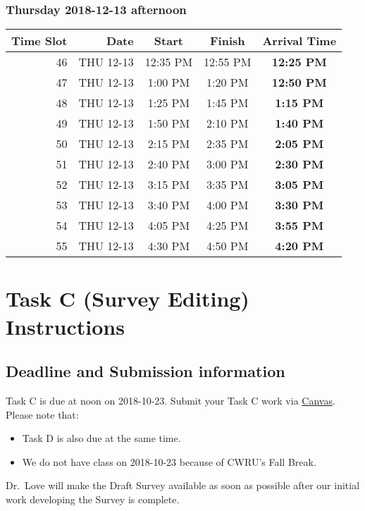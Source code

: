\documentclass[]{book}
\providecommand{\tightlist}{%
  \setlength{\itemsep}{0pt}\setlength{\parskip}{0pt}}
\theoremstyle{definition}
\theoremstyle{definition}
\theoremstyle{definition}
\theoremstyle{remark}
\begin{document}
\hypertarget{thursday-2018-12-13-afternoon}{%
\subsection{Thursday 2018-12-13
afternoon}\label{thursday-2018-12-13-afternoon}}

\begin{longtable}[]{@{}rrccc@{}}
\toprule
Time Slot & Date & Start & Finish & \textbf{Arrival Time}\tabularnewline
\midrule
\endhead
46 & THU 12-13 & 12:35 PM & 12:55 PM & \textbf{12:25 PM}\tabularnewline
47 & THU 12-13 & 1:00 PM & 1:20 PM & \textbf{12:50 PM}\tabularnewline
48 & THU 12-13 & 1:25 PM & 1:45 PM & \textbf{1:15 PM}\tabularnewline
49 & THU 12-13 & 1:50 PM & 2:10 PM & \textbf{1:40 PM}\tabularnewline
50 & THU 12-13 & 2:15 PM & 2:35 PM & \textbf{2:05 PM}\tabularnewline
51 & THU 12-13 & 2:40 PM & 3:00 PM & \textbf{2:30 PM}\tabularnewline
52 & THU 12-13 & 3:15 PM & 3:35 PM & \textbf{3:05 PM}\tabularnewline
53 & THU 12-13 & 3:40 PM & 4:00 PM & \textbf{3:30 PM}\tabularnewline
54 & THU 12-13 & 4:05 PM & 4:25 PM & \textbf{3:55 PM}\tabularnewline
55 & THU 12-13 & 4:30 PM & 4:50 PM & \textbf{4:20 PM}\tabularnewline
\bottomrule
\end{longtable}

\hypertarget{taskC}{%
\chapter{Task C (Survey Editing) Instructions}\label{taskC}}

\hypertarget{deadline-and-submission-information-2}{%
\section{Deadline and Submission
information}\label{deadline-and-submission-information-2}}

Task C is due at noon on 2018-10-23. Submit your Task C work via
\href{https://canvas.case.edu/}{Canvas}. Please note that:

\begin{itemize}
\tightlist
\item
  Task D is also due at the same time.
\item
  We do not have class on 2018-10-23 because of CWRU's Fall Break.
\end{itemize}

Dr.~Love will make the Draft Survey available as soon as possible after
our initial work developing the Survey is complete.
\end{document}
